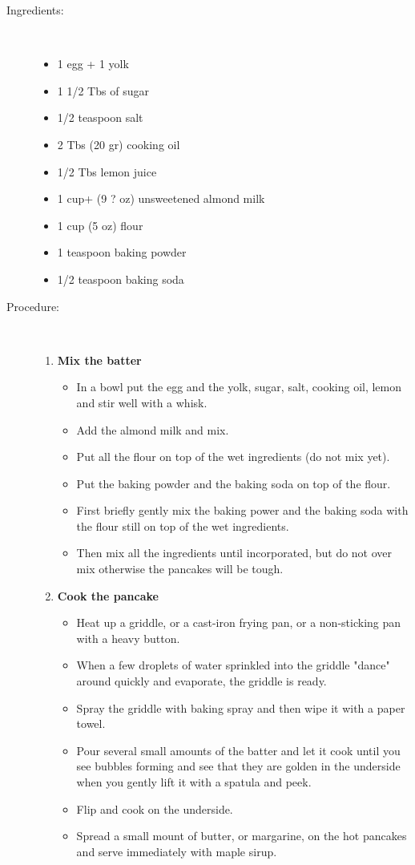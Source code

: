 \documentclass[11pt,letterpaper]{article}
\begin{document}
\begin{description}

\item[Ingredients:]\ \\
	\begin{itemize}
	\item 1 egg + 1 yolk
	\item 1 1/2 Tbs of sugar 
	\item 1/2 teaspoon salt
	\item 2 Tbs (20 gr) cooking oil
	\item 1/2 Tbs lemon juice
	\item 1 cup+ (9 ? oz) unsweetened almond milk
	\item 1 cup (5 oz) flour
	\item 1 teaspoon baking powder
	\item 1/2 teaspoon baking soda
	\end{itemize}

\item[Procedure:]\ \\

	\begin{enumerate}
	\item {\bf Mix the batter}
	\begin{itemize}
	\item In a bowl put the egg and the yolk, sugar, salt, cooking oil, lemon and stir well with a whisk.
	\item Add the almond milk and mix.
	\item Put all the flour on top of the wet ingredients (do not mix yet).
	\item Put the baking powder and the baking soda on top of the flour.
	\item First briefly gently mix the baking power and the baking soda with the flour still on top of the wet ingredients.
	\item Then mix all the ingredients until incorporated, but do not over mix otherwise the pancakes will be tough.
	\end{itemize}

	\item {\bf Cook the pancake}
	\begin{itemize}
	\item Heat up a griddle, or a cast-iron frying pan, or a non-sticking pan with a heavy button.
	\item When a few droplets of water sprinkled into the griddle "dance" around quickly and evaporate, the griddle is ready.
	\item Spray the griddle with baking spray and then wipe it with a paper towel.
	\item Pour several small amounts of the batter and let it cook until you see bubbles forming and see that they are golden in the underside when you gently lift it with a spatula and peek.
	\item Flip and cook on the underside.
	\item Spread a small mount of butter, or margarine, on the hot pancakes and serve immediately with maple sirup.
	\end{itemize}

	\end{enumerate}
\end{description}
\end{document}
